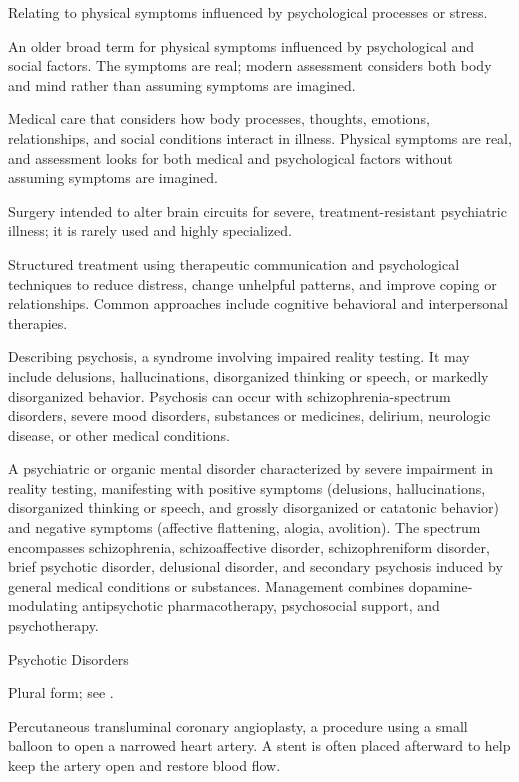  Relating to physical symptoms influenced by psychological processes or stress.

 An older broad term for physical symptoms influenced by psychological and social factors. The symptoms are real; modern assessment considers both body and mind rather than assuming symptoms are imagined.

 Medical care that considers how body processes, thoughts, emotions, relationships, and social conditions interact in illness. Physical symptoms are real, and assessment looks for both medical and psychological factors without assuming symptoms are imagined.

 Surgery intended to alter brain circuits for severe, treatment-resistant psychiatric illness; it is rarely used and highly specialized.

 Structured treatment using therapeutic communication and psychological techniques to reduce distress, change unhelpful patterns, and improve coping or relationships. Common approaches include cognitive behavioral and interpersonal therapies.

 Describing psychosis, a syndrome involving impaired reality testing. It may include delusions, hallucinations, disorganized thinking or speech, or markedly disorganized behavior. Psychosis can occur with schizophrenia-spectrum disorders, severe mood disorders, substances or medicines, delirium, neurologic disease, or other medical conditions.

 A psychiatric or organic mental disorder characterized by severe impairment in reality testing, manifesting with positive symptoms (delusions, hallucinations, disorganized thinking or speech, and grossly disorganized or catatonic behavior) and negative symptoms (affective flattening, alogia, avolition). The spectrum encompasses schizophrenia, schizoaffective disorder, schizophreniform disorder, brief psychotic disorder, delusional disorder, and secondary psychosis induced by general medical conditions or substances. Management combines dopamine-modulating antipsychotic pharmacotherapy, psychosocial support, and psychotherapy.

\synonyms
Psychotic Disorders

 Plural form; see .

 Percutaneous transluminal coronary angioplasty, a procedure using a small balloon to open a narrowed heart artery. A stent is often placed afterward to help keep the artery open and restore blood flow.

